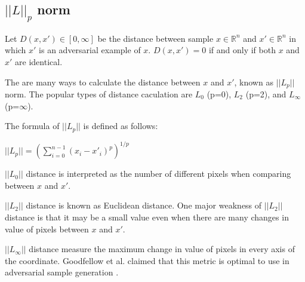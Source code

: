 \documentclass[12pt]{article}
\begin{document}
%
%
%
%
%

\subsection{$||L||_p$ norm}

Let $D(x, x') \in [0, \infty]$ be the distance between sample $x \in \mathbb{R}^n$ and $x' \in \mathbb{R}^n$ in which $x'$ is an adversarial example of $x$. $D(x, x') = 0$ if and only if both $x$ and $x'$ are identical.

The are many ways to calculate the distance between $x$ and $x'$, known as $ ||L_p||$ norm. The popular types of distance caculation are $L_0$ (p=0), $L_2$ (p=2), and $L_\infty$ (p=$\infty$).

The formula of $||L_p||$ is defined as follows:

\begin{center}
	$||L_p|| = (\sum_{i=0}^{n-1} (x_i-x'_i)^p)^{1/p} $
\end{center}

$||L_0||$ distance is interpreted as the number of different pixels when comparing between $x$ and $x'$.

$||L_2||$ distance is known as Euclidean distance. One major weakness of $||L_2||$ distance is that it may be a small value even when there are many changes in value of pixels between $x$ and $x'$.

$||L_\infty||$ distance measure the maximum change in value of pixels in every axis of the coordinate. Goodfellow et al. claimed that this metric is optimal to use in adversarial sample generation \cite{DBLP:journals/corr/GrossePM0M16}.
\end{document}
